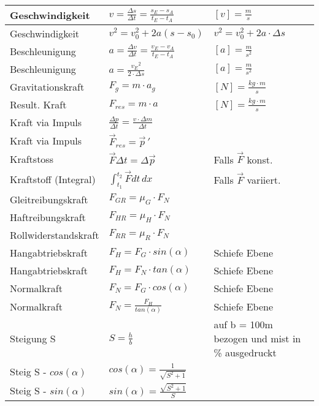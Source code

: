\noindent
\begin{tabularx}{\columnwidth}{@{}XXX@{}}
	Geschwindigkeit   & $ v = \frac{\Delta s}{\Delta t} = \frac{s_E - s_A}{t_E - t_A} $ & $ [v] = \frac{m}{s} $         \\ \hline
	Geschwindigkeit & $v^2 = v^2_0 + 2a(s-s_0)$ & $v^2 = v^2_0 + 2a\cdot \Delta s$ \\ \hline
	Beschleunigung    & $ a = \frac{\Delta v}{\Delta t} = \frac{v_E - v_A}{t_E - t_A} $ & $ [a] = \frac{m}{s^2} $       \\ \hline
	Beschleunigung    & $ a = \frac{{v_E}^2}{2\cdot\Delta s} $ & $ [a] = \frac{m}{s^2} $ \\ \hline
	Gravitationskraft & $ F_g = m\cdot a_g $                                            & $ [N] = \frac{kg\cdot m}{s} $ \\ \hline
	Result. Kraft     & $ F_{res} = m\cdot a $                                          & $ [N] = \frac{kg\cdot m}{s} $ \\ \hline
	Kraft via Impuls  & $ \frac{\Delta p}{\Delta t} = \frac{v\cdot \Delta m}{\Delta t} $ \\ \hline
	Kraft via Impuls  & $\vec{F}_{res} = \vec{p}\,'$  \\ \hline
	Kraftstoss & $ \vec{F}\Delta t = \Delta\vec{p} $ & Falls $\vec{F}$ konst.\\ \hline
	Kraftstoff (Integral) & $ \int_{t_1}^{t_2} \vec{F}dt \,dx $ & Falls $\vec{F}$ variiert.\\ \hline
	Gleitreibungskraft & $ F_{GR} = \mu_G\cdot F_N $ \\ \hline
	Haftreibungskraft & $ F_{HR} = \mu_H\cdot F_N $ \\ \hline
	Rollwiderstandskraft & $ F_{RR} = \mu_R\cdot F_N $ \\ \hline
	Hangabtriebskraft & $ F_H = F_G \cdot sin(\alpha) $ & Schiefe Ebene \\ \hline
	Hangabtriebskraft & $ F_H = F_N \cdot tan(\alpha) $ & Schiefe Ebene \\ \hline
	Normalkraft & $ F_N = F_G \cdot cos(\alpha) $ & Schiefe Ebene \\ \hline
	Normalkraft & $ F_N = \frac{F_H}{tan(\alpha)} $ & Schiefe Ebene \\ \hline
	Steigung S & $S = \frac{h}{b}$ & auf b = 100m bezogen und mist in \% ausgedruckt \\ \hline
	Steig S - $cos(\alpha)$ & $cos(\alpha) = \frac{1}{\sqrt{S^2+1}}$ \\ \hline
	Steig S - $sin(\alpha)$ & $sin(\alpha) = \frac{\sqrt{S^2+1}}{S}$ \\ \hline

\end{tabularx}

